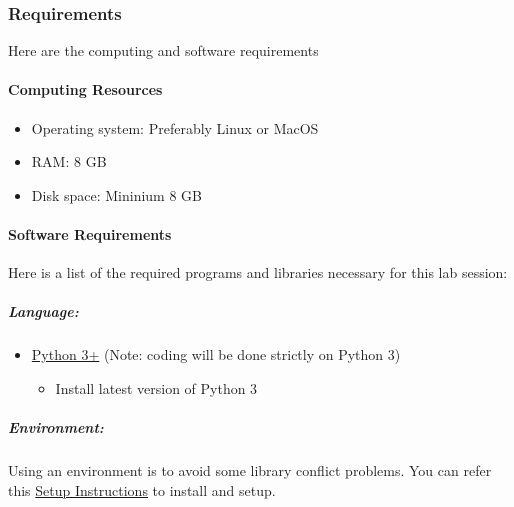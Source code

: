 \documentclass[11pt]{article}
\providecommand{\tightlist}{%
      \setlength{\itemsep}{0pt}\setlength{\parskip}{0pt}}
\begin{document}
    \hypertarget{requirements}{%
\subsubsection{Requirements}\label{requirements}}

Here are the computing and software requirements

\hypertarget{computing-resources}{%
\paragraph{Computing Resources}\label{computing-resources}}

\begin{itemize}
\tightlist
\item
  Operating system: Preferably Linux or MacOS
\item
  RAM: 8 GB
\item
  Disk space: Mininium 8 GB
\end{itemize}

\hypertarget{software-requirements}{%
\paragraph{Software Requirements}\label{software-requirements}}

Here is a list of the required programs and libraries necessary for this
lab session:

\hypertarget{language}{%
\subparagraph{Language:}\label{language}}

\begin{itemize}
\tightlist
\item
  \href{https://www.python.org/download/releases/3.0/}{Python 3+} (Note:
  coding will be done strictly on Python 3)

  \begin{itemize}
  \tightlist
  \item
    Install latest version of Python 3
  \end{itemize}
\end{itemize}

\hypertarget{environment}{%
\subparagraph{Environment:}\label{environment}}

Using an environment is to avoid some library conflict problems. You can
refer this \href{http://cs231n.github.io/setup-instructions/}{Setup
Instructions} to install and setup.
\end{document}
